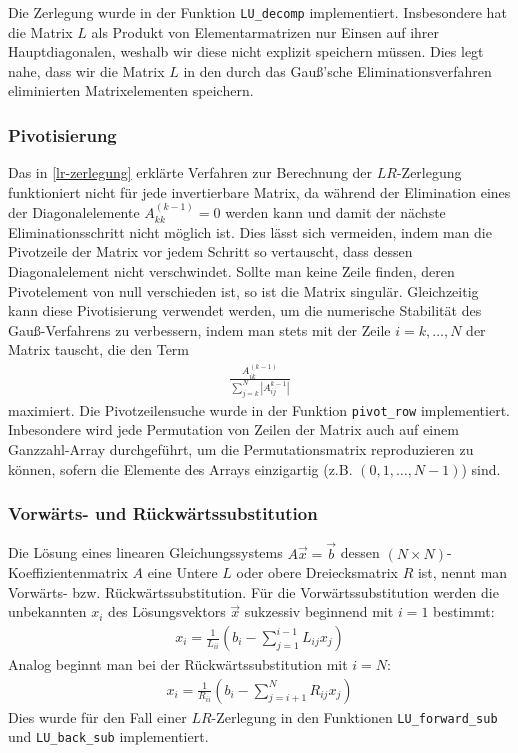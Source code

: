 \documentclass[10pt,a4paper]{article}
\begin{document}
Die Zerlegung wurde in der Funktion \texttt{LU\_decomp} implementiert. Insbesondere hat die Matrix $L$ als Produkt von Elementarmatrizen nur Einsen auf ihrer Hauptdiagonalen, weshalb wir diese nicht explizit speichern müssen. Dies legt nahe, dass wir die Matrix $L$ in den durch das Gauß'sche Eliminationsverfahren eliminierten Matrixelementen speichern.

\subsubsection{Pivotisierung}
\label{pivotisierung}
Das in \ref{lr-zerlegung} erklärte Verfahren zur Berechnung der $LR$-Zerlegung funktioniert nicht für jede invertierbare Matrix, da während der Elimination eines der Diagonalelemente $A^{(k-1)}_{kk} = 0$ werden kann und damit der nächste Eliminationsschritt nicht möglich ist. Dies lässt sich vermeiden, indem man die Pivotzeile der Matrix vor jedem Schritt so vertauscht, dass dessen Diagonalelement nicht verschwindet. Sollte man keine Zeile finden, deren Pivotelement von null verschieden ist, so ist die Matrix singulär. Gleichzeitig kann diese Pivotisierung verwendet werden, um die numerische Stabilität des Gauß-Verfahrens zu verbessern, indem man stets mit der Zeile $i = k, \dots, N$ der Matrix tauscht, die den Term
\begin{align}
	\frac{A^{(k-1)}_{ik}}{\sum_{j=k}^N \left|A^{k-1}_{ij}\right| }
\end{align}
maximiert. Die Pivotzeilensuche wurde in der Funktion \texttt{pivot\_row} implementiert. Inbesondere wird jede Permutation von Zeilen der Matrix auch auf einem Ganzzahl-Array durchgeführt, um die Permutationsmatrix reproduzieren zu können, sofern die Elemente des Arrays einzigartig (z.B. $(0, 1, \dots, N-1) $) sind.

\subsubsection{Vorwärts- und Rückwärtssubstitution}
Die Lösung eines linearen Gleichungssystems $A\vec{x} = \vec{b}$ dessen $(N \times N)$-Koeffizientenmatrix $A$ eine Untere $L$ oder obere Dreiecksmatrix $R$ ist, nennt man Vorwärts- bzw. Rückwärtssubstitution. Für die Vorwärtssubstitution werden die unbekannten $x_i$ des Lösungsvektors $\vec{x}$ sukzessiv beginnend mit $i = 1$ bestimmt:
\begin{align}
	x_i = \frac{1}{L_{ii}} \left( b_i - \sum_{j = 1}^{i-1} L_{ij} x_j \right)
\end{align}
Analog beginnt man bei der Rückwärtssubstitution mit $i = N$:
\begin{align}
	x_i = \frac{1}{R_{ii}} \left( b_i - \sum_{j=i+1}^{N} R_{ij} x_j \right)
\end{align}
Dies wurde für den Fall einer $LR$-Zerlegung in den Funktionen \texttt{LU\_forward\_sub} und \texttt{LU\_back\_sub} implementiert.
\end{document}
